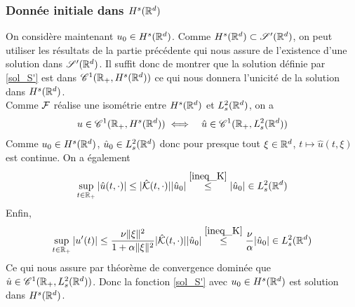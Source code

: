 \subsubsection{Donnée initiale dans \texorpdfstring{$H^s(\mathbb{R}^d)$}{Hs(Rd)}}
On considère maintenant $u_0 \in H^s(\mathbb{R}^d)$. Comme $H^s(\mathbb{R}^d) \subset \mathscr{S}'(\mathbb{R}^d)$, on peut utiliser les résultats de la partie précédente qui nous assure de l'existence d'une solution dans $\mathscr{S}'(\mathbb{R}^d)$. Il suffit donc de montrer que la solution définie par \eqref{sol_S'} est dans $\mathscr{C}^1(\mathbb{R}_+,H^s(\mathbb{R}^d))$ ce qui nous donnera l'unicité de la solution dans $H^s(\mathbb{R}^d)$. 
\\
Comme $\mathcal{F}$ réalise une isométrie entre $H^s(\mathbb{R}^d)$ et $L^2_s(\mathbb{R}^d)$, on a
\begin{eqnarray*}
    u \in \mathscr{C}^1(\mathbb{R}_+,H^s(\mathbb{R}^d)) &\iff& \hat{u} \in \mathscr{C}^1(\mathbb{R}_+, L^2_s(\mathbb{R}^d))
\end{eqnarray*}
Comme $u_0 \in H^s(\mathbb{R}^d)$, $\hat{u}_0 \in L_s^2(\mathbb{R}^d)$ donc pour presque tout $\xi \in \mathbb{R}^d$, $t \mapsto \hat{u}(t,\xi)$ est continue. On a également
\begin{equation*}
    \sup_{t \in \mathbb{R}_+}|\hat{u}(t,\cdot)| \leq |\hat{\mathcal{K}}(t,\cdot)||\hat{u}_0| \overset{\eqref{ineq_K}}{\leq} |\hat{u}_0| \in L^2_s(\mathbb{R}^d)
\end{equation*}
Enfin, 
\begin{equation*}
    \sup_{t \in \mathbb{R}_+} |u'(t)| \leq \frac{\nu\|\xi\|^2}{1+\alpha\|\xi\|^2}|\hat{\mathcal{K}}(t,\cdot)||\hat{u}_0| \overset{\eqref{ineq_K}}{\leq} \frac{\nu}{\alpha}|\hat{u}_0| \in L^2_s(\mathbb{R}^d)
\end{equation*}
Ce qui nous assure par théorème de convergence dominée que $\hat{u} \in \mathscr{C}^1(\mathbb{R}_+,L^2_s(\mathbb{R}^d))$. Donc la fonction \eqref{sol_S'} avec $u_0 \in H^s(\mathbb{R}^d)$ est solution dans $H^s(\mathbb{R}^d)$.

